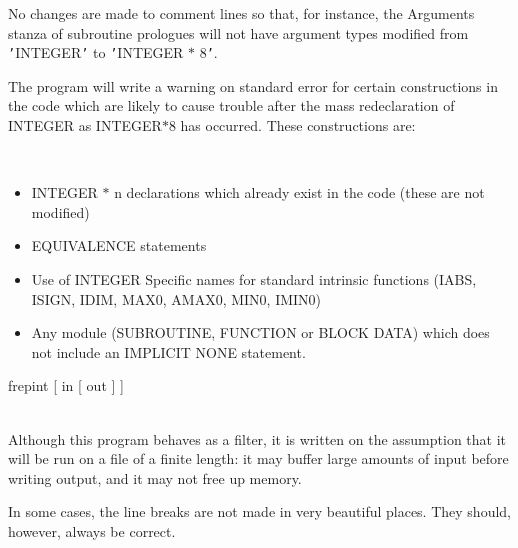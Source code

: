\documentclass[twoside,11pt]{article}
\renewcommand{\_}{\texttt{\symbol{95}}}
\newcommand{\sstusage}[1]{\item[Usage:] \mbox{}
   \begin{description}
      {\ssttt \item #1}
   \end{description}
}
\newcommand{\sstnotes}[1]{\item[Notes:] \mbox{} \\[1.3ex] #1}
\newcommand{\sstbugs}[1]{\item[Bugs:] #1}
\newcommand{\sstitemlist}[1]{
  \mbox{} \\
  \vspace{-3.5ex}
  \begin{itemize}
     #1
  \end{itemize}
}
\newcommand{\sstitem}{\item}
\newcommand{\sstusage}[1]{\item[Usage:]
      \begin{description}
         {\ssttt #1}
      \end{description}
      \\
   }
\newcommand{\sstnotes}[1]{\item[Notes:] #1 }
\newcommand{\sstitemlist}[1]{
      \begin{itemize}
         #1
      \end{itemize}
      \\
   }
\newcommand{\sstitem}{\item}
\begin{document}
{{      No changes are made to comment lines so that, for instance, the
      Arguments stanza of subroutine prologues will not have argument
      types modified from {\tt '}INTEGER{\tt '} to {\tt '}INTEGER $*$ 8{\tt '}.

      The program will write a warning on standard error for certain
      constructions in the code which are likely to cause trouble after
      the mass redeclaration of INTEGER as INTEGER$*$8 has occurred.
      These constructions are:
      \sstitemlist{

         \sstitem
            INTEGER $*$ n declarations which already exist in the code
              (these are not modified)

         \sstitem
            EQUIVALENCE statements

         \sstitem
            Use of INTEGER Specific names for standard intrinsic functions
              (IABS, ISIGN, IDIM, MAX0, AMAX0, MIN0, IMIN0)

         \sstitem
            Any module (SUBROUTINE, FUNCTION or BLOCK DATA) which does not
              include an IMPLICIT NONE statement.
      }
   }
   \sstusage{
      frepint [ in [ out ] ]
   }
   \sstnotes{
      Although this program behaves as a filter, it is written on
      the assumption that it will be run on a file of a finite length:
      it may buffer large amounts of input before writing output, and
      it may not free up memory.
   }
   \sstbugs{
      In some cases, the line breaks are not made in very beautiful places.
      They should, however, always be correct.
   }
}
\newpage
\end{document}

